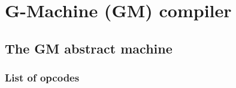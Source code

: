\section{G-Machine (GM) compiler}
\label{sec:gm}

\subsection{The GM abstract machine}
\label{sec:gm-machine}

\subsubsection{List of opcodes}
\label{sec:gm-opcodes}



